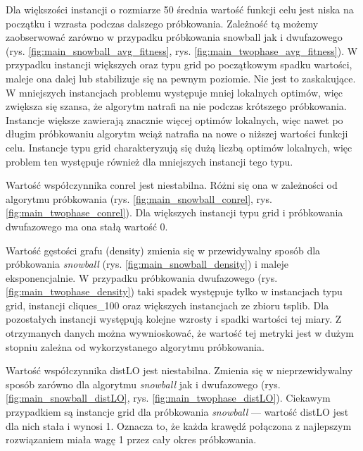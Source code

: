 Dla większości instancji o rozmiarze 50 średnia wartość funkcji celu jest niska na początku i wzrasta podczas dalszego próbkowania.
Zależność tą możemy zaobserwować zarówno w przypadku próbkowania snowball jak i dwufazowego (rys. \ref{fig:main_snowball_avg_fitness}, rys. \ref{fig:main_twophase_avg_fitness}).
W przypadku instancji większych oraz typu grid po początkowym spadku wartości, maleje ona dalej lub stabilizuje się na pewnym poziomie.
Nie jest to zaskakujące. W mniejszych instancjach problemu występuje mniej lokalnych optimów, więc zwiększa się szansa, że algorytm
natrafi na nie podczas krótszego próbkowania. Instancje większe zawierają znacznie więcej optimów lokalnych, więc nawet po długim próbkowaniu
algorytm wciąż natrafia na nowe o niższej wartości funkcji celu. Instancje typu grid charakteryzują się dużą liczbą optimów lokalnych,
więc problem ten występuje również dla mniejszych instancji tego typu.

Wartość współczynnika conrel jest niestabilna. Różni się ona w zależności od algorytmu próbkowania (rys. \ref{fig:main_snowball_conrel}, rys. \ref{fig:main_twophase_conrel}).
Dla większych instancji typu grid i próbkowania dwufazowego ma ona stałą wartość 0.

Wartość gęstości grafu (density) zmienia się w przewidywalny sposób dla próbkowania \textit{snowball} (rys. \ref{fig:main_snowball_density}) i maleje eksponencjalnie.
W przypadku próbkowania dwufazowego (rys. \ref{fig:main_twophase_density}) taki spadek występuje tylko w instancjach typu grid, instancji cliques\_100 oraz większych
instancjach ze zbioru tsplib.
Dla pozostałych instancji występują kolejne wzrosty i spadki wartości tej miary.
Z otrzymanych danych można wywnioskować, że wartość tej metryki jest w dużym stopniu zależna od wykorzystanego algorytmu próbkowania.

Wartość współczynnika distLO jest niestabilna. Zmienia się w nieprzewidywalny sposób zarówno dla algorytmu \textit{snowball} jak i dwufazowego (rys. \ref{fig:main_snowball_distLO}, rys. \ref{fig:main_twophase_distLO}).
Ciekawym przypadkiem są instancje grid dla próbkowania \textit{snowball} --- wartość distLO jest dla nich stała i wynosi 1. Oznacza to, że każda krawędź połączona
z najlepszym rozwiązaniem miała wagę 1 przez cały okres próbkowania.

